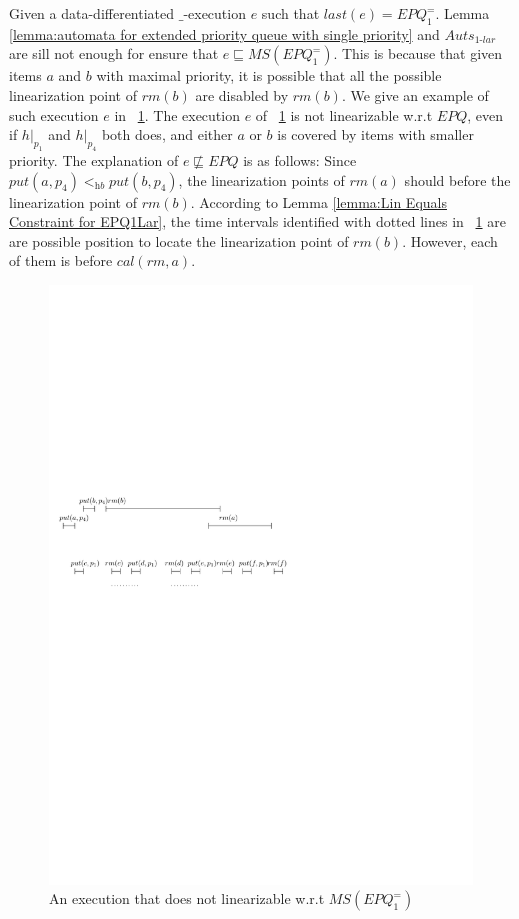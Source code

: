 Given a data-differentiated $\_$-execution $e$ such that $\textit{last}(e) = \textit{EPQ}_1^{=}$. Lemma \ref{lemma:automata for extended priority queue with single priority} and $\textit{Auts}_{\textit{1-lar}}$ are sill not enough for ensure that $e \sqsubseteq \textit{MS}(\textit{EPQ}_1^{=})$. This is because that given items $a$ and $b$ with maximal priority, it is possible that all the possible linearization point of $\textit{rm}(b)$ are disabled by $\textit{rm}(b)$. We give an example of such execution $e$ in \figurename~\ref{fig:introduce pb order}. The execution $e$ of \figurename~\ref{fig:introduce pb order} is not linearizable w.r.t $\textit{EPQ}$, even if $h \vert_{p_1}$ and $h \vert_{p_4}$ both does, and either $a$ or $b$ is covered by items with smaller priority. The explanation of $e \not\sqsubseteq \textit{EPQ}$ is as follows: Since $\textit{put}(a,p_4) <_{\textit{hb}} \textit{put}(b,p_4)$, the linearization points of $\textit{rm}(a)$ should before the linearization point of $\textit{rm}(b)$. According to Lemma \ref{lemma:Lin Equals Constraint for EPQ1Lar}, the time intervals identified with dotted lines in \figurename~\ref{fig:introduce pb order} are are possible position to locate the linearization point of $\textit{rm}(b)$. However, each of them is before $\textit{cal}(\textit{rm},a)$.

\begin{figure}[htbp]
  \centering
  \includegraphics[width=0.6 \textwidth]{figures/PIC-HIS-INTRO-PB-ORDER-EPQ.pdf}
  \caption{An execution that does not linearizable w.r.t $\textit{MS}(\textit{EPQ}_1^{=})$}
  \label{fig:introduce pb order}
\end{figure}

